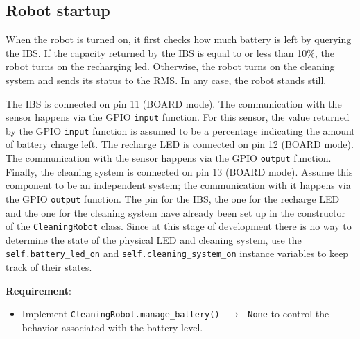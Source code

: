 \subsection{Robot startup}
When the robot is turned on, it first checks how much battery is left by querying the IBS. If the capacity returned by the IBS is equal to or less than 10\%, the robot turns on the recharging led. Otherwise, the robot turns on the cleaning system and sends its status to the RMS. In any case, the robot stands still.

The IBS is connected on pin 11 (BOARD mode). The communication with the sensor happens via the GPIO \texttt{input} function. For this sensor, the value returned by the GPIO \texttt{input} function is assumed to be a percentage indicating the amount of battery charge left. 
The recharge LED is connected on pin 12 (BOARD mode). The communication with the sensor happens via the GPIO \texttt{output} function.
Finally, the cleaning system is connected on pin 13 (BOARD mode). Assume this component to be an independent system; the communication with it happens via the GPIO \texttt{output} function.
The pin for the IBS, the one for the recharge LED and the one for the cleaning system have already been set up in the constructor of the \texttt{CleaningRobot} class.
Since at this stage of development there is no way to determine the state of the physical LED and cleaning system, use the \texttt{self.battery\_led\_on} and \texttt{self.cleaning\_system\_on} instance variables to keep track of their states.

\noindent\textbf{Requirement}:
\begin{itemize}
    \item Implement \texttt{CleaningRobot.manage\_battery() $\,\to\,$ None} to control the behavior associated with the battery level.
\end{itemize}


